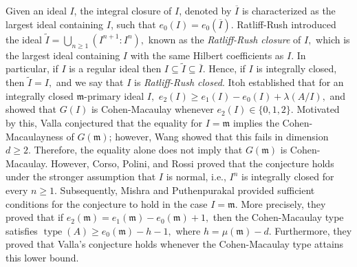 \documentclass[11pt]{amsart}
\theoremstyle{plain}
\newcommand{\m}{\mathfrak{m}}
\newcommand{\type}{\operatorname{type}}
\theoremstyle{plain}
\begin{document}
 Given an ideal $I$, the integral closure of $I$, denoted by  $\overline{I}$ is characterized as the largest ideal containing $I$, such that  $e_{0}(I)=e_{0}(\overline{I})$. Ratliff-Rush introduced the ideal $\widetilde{I}=\displaystyle \bigcup_{n\geq 1}\left(I^{n+1}:I^n\right),$ known as the \textit{Ratliff-Rush closure} of $I,$ which is the largest ideal containing $I$ with the same Hilbert coefficients as $I.$ In particular, if $I$ is a regular ideal then $I \subseteq \widetilde{I} \subseteq \overline{I}.$ Hence, if $I$ is integrally closed, then  $\widetilde{I}=I,$ and we say that $I$ is \textit{Ratliff-Rush closed}. Itoh \cite{itoh1} established that for an integrally closed $\m$-primary ideal $I,$  $e_{2}(I)\geq e_{1}(I)-e_{0}(I)+\lambda(A/I),$ and showed that $G(I)$ is Cohen-Macaulay whenever $e_2(I)\in \{0,1,2\}.$  Motivated by this, Valla \cite[Conjecture 6.20]{valla1998problems} conjectured that the equality for $I=\m$ implies the Cohen-Macaulayness of $G(\m)$; however,  Wang \cite[3.10]{corso2005depth} showed that this fails in dimension $d \geq 2.$ Therefore, the equality alone does not imply that $G(\m)$ is Cohen-Macaulay. However, Corso, Polini, and Rossi \cite{corso2005depth} proved that the conjecture holds under the stronger assumption that $I$ is normal, i.e., $I^{n}$ is integrally closed for every $n \geq 1$. Subsequently, Mishra and Puthenpurakal \cite{ankit} provided sufficient conditions for the conjecture to hold in the case $I=\mathfrak{m}$. More precisely, they proved that if $e_{2}(\mathfrak{m}) = e_{1}(\mathfrak{m}) - e_{0}(\mathfrak{m}) + 1,$ then the Cohen-Macaulay type  satisfies $\type(A) \geq e_{0}(\mathfrak{m}) - h - 1,$ where $h = \mu(\mathfrak{m}) - d$. Furthermore, they proved that Valla’s conjecture holds whenever the Cohen-Macaulay type attains this lower bound.
\end{document}
